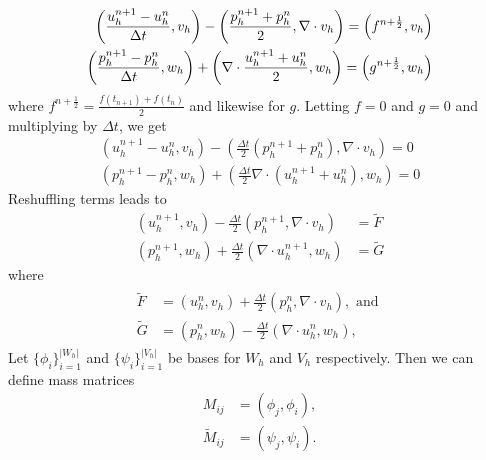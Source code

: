 \documentclass[11pt]{article}
\begin{document}
\begin{equation}{\label{cnacoustic}}
\begin{split}
\left(\frac{u^{n+1}_h-u^n_h}{\Delta t},v_h\right)-\left(\frac{p^{n+1}_h+p^n_h}{2},\nabla \cdot v_h\right) = \left(f^{n+\frac{1}{2}},v_h\right) \\
\left(\frac{p^{n+1}_h-p^n_h}{\Delta t},w_h\right)+\left(\nabla \cdot \frac{u^{n+1}_h+u^n_h}{2},w_h\right) = \left(g^{n+\frac{1}{2}},w_h\right)
\end{split}
\end{equation}
where $f^{n+\frac{1}{2}} = \frac{f(t_{n+1})+f(t_n)}{2}$ and likewise for $g$. Letting $f = 0$ and $g=0$ and multiplying by $\Delta t$, we get
\begin{equation}
\begin{split}
\left(u^{n+1}_h-u^n_h,v_h\right)-\left(\frac{\Delta t}{2}\left(p^{n+1}_h+p^n_h\right),\nabla \cdot v_h\right) = 0 \\
\left(p^{n+1}_h-p^n_h,w_h\right)+\left(\frac{\Delta t}{2}\nabla \cdot\left(u^{n+1}_h+u^n_h\right),w_h\right) = 0
\end{split}
\end{equation}
Reshuffling terms leads to 
\begin{equation}\label{discretizationfinal}
\begin{split}
\left(u^{n+1}_h,v_h\right) - \frac{\Delta t}{2}\left(p^{n+1}_h, \nabla \cdot v_h\right) &= \tilde{F} \\
\left(p^{n+1}_h,w_h\right) + \frac{\Delta t}{2}\left(\nabla \cdot u^{n+1}_h,w_h\right) &= \tilde{G}
\end{split}
\end{equation}
where
\begin{eqnarray}
\begin{split}
\tilde{F} &= \left(u^n_h, v_h\right) +\frac{\Delta t}{2}\left(p^n_h,\nabla \cdot v_h\right), \text{ and }\\
\tilde{G} &= \left(p^n_h,w_h\right) - \frac{\Delta t}{2}\left(\nabla \cdot u^n_h,w_h\right),
\end{split}
\end{eqnarray}
 Let $\{\phi_i\}_{i=1}^{|W_h|}$ and $\{\psi_i\}_{i=1}^{|V_h|}$ be bases for $W_h$ and $V_h$ respectively. Then we can define mass matrices  %
\begin{equation}
\begin{split}
M_{ij} &= (\phi_j,\phi_i), \\
\tilde{M}_{ij} &= (\psi_j,\psi_i).
\end{split}
\end{equation}
\end{document}
